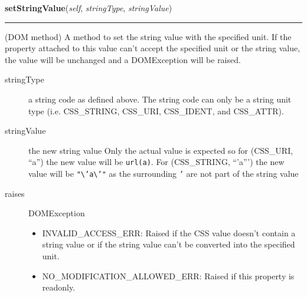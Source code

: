 \hspace{.8\funcindent}\begin{boxedminipage}{\funcwidth}

    \raggedright \textbf{setStringValue}(\textit{self}, \textit{stringType}, \textit{stringValue})

    \vspace{-1.5ex}

    \rule{\textwidth}{0.5\fboxrule}
\setlength{\parskip}{2ex}

(DOM method) A method to set the string value with the specified
unit. If the property attached to this value can't accept the
specified unit or the string value, the value will be unchanged and
a DOMException will be raised.
\begin{description}
\item[{stringType}] \leavevmode 
a string code as defined above. The string code can only be a
string unit type (i.e. CSS{\_}STRING, CSS{\_}URI, CSS{\_}IDENT, and
CSS{\_}ATTR).

\item[{stringValue}] \leavevmode 
the new string value
Only the actual value is expected so for (CSS{\_}URI, ``a'') the
new value will be \texttt{url(a)}. For (CSS{\_}STRING, ``'a''')
the new value will be \texttt{"{\textbackslash}'a{\textbackslash}'"} as the surrounding \texttt{'} are
not part of the string value

\item[{raises}] \leavevmode 
DOMException
\begin{itemize}
\item {} 
INVALID{\_}ACCESS{\_}ERR: Raised if the CSS value doesn't contain a
string value or if the string value can't be converted into
the specified unit.

\item {} 
NO{\_}MODIFICATION{\_}ALLOWED{\_}ERR: Raised if this property is readonly.

\end{itemize}

\end{description}
\setlength{\parskip}{1ex}
    \end{boxedminipage}

    \label{cssutils:css:cssvalue:CSSPrimitiveValue:getCounterValue}

